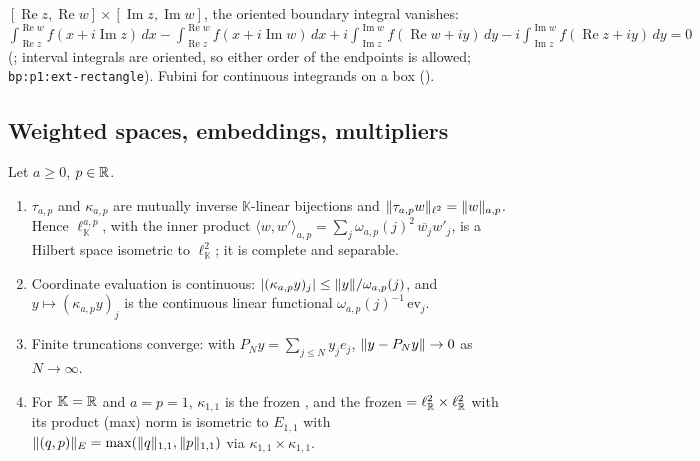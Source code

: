{\begin{enumerate}[label=(W1-E\arabic*),ref=(W1-E\arabic*)]
  $[\operatorname{Re}z,\operatorname{Re}w]\times[\operatorname{Im}z,\operatorname{Im}w]$, the oriented boundary
  integral vanishes:
  $\int_{\operatorname{Re}z}^{\operatorname{Re}w}f(x+i\operatorname{Im}z)\,dx-\int_{\operatorname{Re}z}^{\operatorname{Re}w}f(x+i\operatorname{Im}w)\,dx
  +i\int_{\operatorname{Im}z}^{\operatorname{Im}w}f(\operatorname{Re}w+iy)\,dy-i\int_{\operatorname{Im}z}^{\operatorname{Im}w}f(\operatorname{Re}z+iy)\,dy=0$
  (; interval integrals are
  oriented, so either order of the endpoints is allowed; \texttt{bp:p1:ext-rectangle}). Fubini for continuous
  integrands on a box ().
\end{enumerate}
\par}

\subsection{Weighted spaces, embeddings, multipliers}\label{bpW:w1:weighted}

\begin{lemma}\label{bpW:w1:space}
Let $a\ge0$, $p\in\mathbb{R}$.
\begin{enumerate}[label=(\roman*)]
\item $\tau_{a,p}$ and $\kappa_{a,p}$ are mutually inverse $\mathbb K$-linear bijections and
  $\lVert \tau_{a,p}w\rVert_{\ell^2}=\lVert w\rVert_{a,p}$. Hence $\ell^{a,p}_{\mathbb K}$, with the inner product
  $\langle w,w'\rangle_{a,p}=\sum_j\omega_{a,p}(j)^2\,\overline{w_j}w'_j$, is a Hilbert space isometric to
  $\ell^2_{\mathbb K}$; it is complete and separable.
\item Coordinate evaluation is continuous: $\lvert (\kappa_{a,p}y)_j\rvert\le\lVert y\rVert/\omega_{a,p}(j)$, and
  $y\mapsto(\kappa_{a,p}y)_j$ is the continuous linear functional $\omega_{a,p}(j)^{-1}\,\mathrm{ev}_j$.
\item Finite truncations converge: with $P_Ny=\sum_{j\le N}y_je_j$, $\lVert y-P_Ny\rVert\to0$ as $N\to\infty$.
\item For $\mathbb K=\mathbb{R}$ and $a=p=1$, $\kappa_{1,1}$ is the frozen , and the frozen 
  $=\ell^2_{\mathbb{R}}\times\ell^2_{\mathbb{R}}$ with its product (max) norm is isometric to $E_{1,1}$ with
  $\lVert (q,p)\rVert_E=\max(\lVert q\rVert_{1,1},\lVert p\rVert_{1,1})$ via $\kappa_{1,1}\times\kappa_{1,1}$.
\end{enumerate}
\end{lemma}

